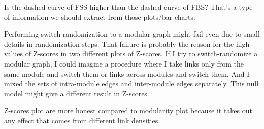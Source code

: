 {	Is the dashed curve of FSS higher than the dashed curve of FBS? That's a type of information we should extract from those plots/bar charts.
	
	Performing switch-randomization to a modular graph might fail even due to small details in randomization steps. That failure is probably the reason for the high values of Z-scores in two different plots of Z-scores. If I try to switch-randomize a modular graph, I could imagine a procedure where I take links only from the same module and switch them or links across modules and switch them. And I mixed the sets of intra-module edges and inter-module edges separately. This null model might give a different result in Z-scores.
	
	Z-scores plot are more honest compared to modularity plot because it takes out any effect that comes from different link densities.
}
